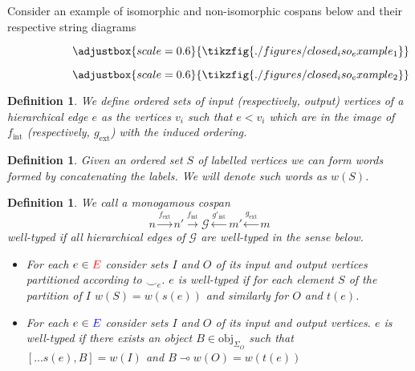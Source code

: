 \documentclass[peerreviewcls]{IEEEtran}
\newtheorem{definition}[theorem]{Definition}
\newcommand{\consistency}{{\smile}}
\begin{document}
Consider an example of isomorphic and non-isomorphic cospans below and their respective string diagrams

\begin{figure}
  \begin{subfigure}[c]{0.4\linewidth}
    \[
    \adjustbox{scale=0.6}{
    \tikzfig{./figures/closed_iso_example_1}
    }
    \]
  \end{subfigure}
  \hfill
  \begin{subfigure}[c]{0.4\linewidth}
    \[
    \adjustbox{scale=0.6}{
    \tikzfig{./figures/closed_iso_example_2}
    }
    \]
  \end{subfigure}
\end{figure}

\begin{definition}

We define ordered sets of \textit{input} (respectively, \textit{output}) vertices of a hierarchical edge $e$ as the vertices $v_{i}$ such that $e < v_{i}$ which are in the image of $f_{\text{int}}$ (respectively, $g_{\text{ext}}$) with the induced ordering.
\end{definition}

\begin{definition}

Given an ordered set $S$ of labelled vertices we can form words formed by concatenating the labels.
We will denote such words as $w(S)$.
\end{definition}

\begin{definition}
We call a monogamous cospan
\[
  n \xrightarrow{f_{\text{ext}}} n' \xrightarrow{f_{\text{int}}} \mathcal{G} \xleftarrow{g'_{\text{int}}} m' \xleftarrow{g_{\text{ext}}} m
\]
\textit{well-typed} if all hierarchical edges of $\mathcal{G}$ are well-typed in the sense below.
\begin{itemize}
  \item For each $e \in \textcolor{red}{E}$ consider sets $I$ and $O$ of its input and output vertices partitioned according to $\consistency_{e}$.
        $e$ is well-typed if for each element $S$ of the partition of $I$ $w(S) = w(s(e))$ and similarly for $O$ and $t(e)$.
  \item For each $e \in \textcolor{blue}{E}$ consider sets $I$ and $O$ of its input and output vertices.
        $e$ is well-typed if there exists an object $B \in \text{obj}_{\Sigma_{O}}$ such that $[...s(e), B] = w(I)$ and $B \multimap w(O) = w(t(e))$
\end{itemize}
\end{definition}





\end{document}
